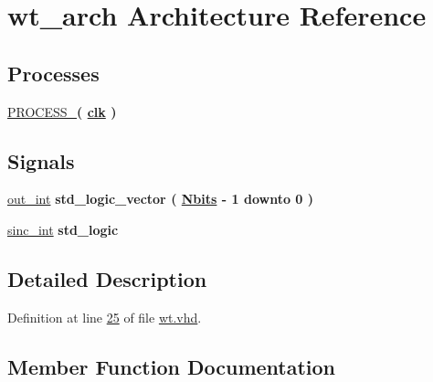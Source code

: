 \hypertarget{classwt_1_1wt__arch}{}\section{wt\+\_\+arch Architecture Reference}
\label{classwt_1_1wt__arch}
\subsection*{Processes}
 \begin{DoxyCompactItemize}
\item 
\hyperlink{classwt_1_1wt__arch_a5427232bb22991550e6168cf5171fc30}{P\+R\+O\+C\+E\+S\+S\+\_}{\bfseries  ( {\bfseries {\bfseries \hyperlink{classwt_a4a4609c199d30b3adebbeb3a01276ec5}{clk}} \textcolor{vhdlchar}{ }} )}
\end{DoxyCompactItemize}
\subsection*{Signals}
 \begin{DoxyCompactItemize}
\item 
\hyperlink{classwt_1_1wt__arch_a495e571184c4e4e4665241de22f331cc}{out\+\_\+int} {\bfseries \textcolor{comment}{std\+\_\+logic\+\_\+vector}\textcolor{vhdlchar}{ }\textcolor{vhdlchar}{(}\textcolor{vhdlchar}{ }\textcolor{vhdlchar}{ }\textcolor{vhdlchar}{ }\textcolor{vhdlchar}{ }{\bfseries \hyperlink{classwt_a8b45761acb3f2e683677c4eb77d442b0}{Nbits}} \textcolor{vhdlchar}{-\/}\textcolor{vhdlchar}{ } \textcolor{vhdldigit}{1} \textcolor{vhdlchar}{ }\textcolor{keywordflow}{downto}\textcolor{vhdlchar}{ }\textcolor{vhdlchar}{ } \textcolor{vhdldigit}{0} \textcolor{vhdlchar}{ }\textcolor{vhdlchar}{)}\textcolor{vhdlchar}{ }} 
\item 
\hyperlink{classwt_1_1wt__arch_a45126d1a75be347f440d181b7aa5e033}{sinc\+\_\+int} {\bfseries \textcolor{comment}{std\+\_\+logic}\textcolor{vhdlchar}{ }} 
\end{DoxyCompactItemize}


\subsection{Detailed Description}


Definition at line \hyperlink{wt_8vhd_source_l00025}{25} of file \hyperlink{wt_8vhd_source}{wt.\+vhd}.



\subsection{Member Function Documentation}
\hypertarget{classwt_1_1wt__arch_a5427232bb22991550e6168cf5171fc30}{}
